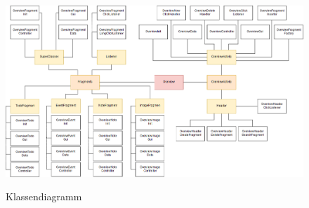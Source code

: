 \begin{figure}[H]
\centering
\begin{minipage}[t]{1\textwidth} %
\caption{Klassendiagramm} %
\includegraphics[width=1\textwidth]{img/Klassendiagramm_lite}\\ %
\end{minipage}
\end{figure}


